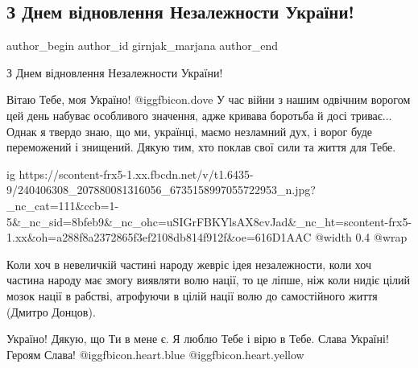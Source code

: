  
 
 
 
 
 
\subsection{З Днем відновлення Незалежности України!}
\label{sec:24_08_2021.fb.girnjak_marjana.1.nezalezhnist}
 
\ifcmt
 author_begin
   author_id girnjak_marjana
 author_end
\fi

З Днем відновлення Незалежности України!

Вітаю Тебе, моя Україно! @igg{fbicon.dove}  У час війни з нашим одвічним ворогом цей день
набуває особливого значення, адже кривава боротьба й досі триває... Однак я
твердо знаю, що ми, українці, маємо незламний дух, і ворог буде переможений і
знищений. Дякую тим, хто поклав свої сили та життя для Тебе. 

\ifcmt
  ig https://scontent-frx5-1.xx.fbcdn.net/v/t1.6435-9/240406308_207880081316056_6735158997055722953_n.jpg?_nc_cat=111&ccb=1-5&_nc_sid=8bfeb9&_nc_ohc=uSIGrFBKYlsAX8cvJad&_nc_ht=scontent-frx5-1.xx&oh=a288f8a2372865f3ef2108db814f912f&oe=616D1AAC
  @width 0.4
  @wrap 
\fi

Коли хоч в невеличкій частині народу жевріє ідея незалежности, коли хоч частина
народу має змогу виявляти волю нації, то це ліпше, ніж коли нидіє цілий мозок
нації в рабстві, атрофуючи в цілій нації волю до самостійного життя (Дмитро
Донцов).

Україно! Дякую, що Ти в мене є. Я люблю Тебе і вірю в Тебе. Слава Україні!
Героям Слава! @igg{fbicon.heart.blue}  @igg{fbicon.heart.yellow} 
